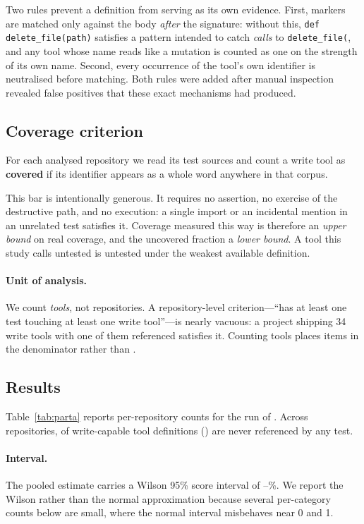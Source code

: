 \documentclass[11pt]{article}
\begin{document}
Two rules prevent a definition from serving as its own evidence. First, markers are
matched only against the body \emph{after} the signature: without this,
\texttt{def delete\_file(path)} satisfies a pattern intended to catch \emph{calls} to
\texttt{delete\_file(}, and any tool whose name reads like a mutation is counted as one
on the strength of its own name. Second, every occurrence of the tool's own identifier
is neutralised before matching. Both rules were added after manual inspection revealed
false positives that these exact mechanisms had produced.

\subsection{Coverage criterion}

For each analysed repository we read its test sources and count a write tool as
\textbf{covered} if its identifier appears as a whole word anywhere in that corpus.

This bar is intentionally generous. It requires no assertion, no exercise of the
destructive path, and no execution: a single import or an incidental mention in an
unrelated test satisfies it. Coverage measured this way is therefore an \emph{upper
bound} on real coverage, and the uncovered fraction a \emph{lower bound}. A tool this
study calls untested is untested under the weakest available definition.

\paragraph{Unit of analysis.} We count \emph{tools}, not repositories. A repository-level
criterion---``has at least one test touching at least one write tool''---is nearly
vacuous: a project shipping 34 write tools with one of them referenced satisfies it.
Counting tools places \AcTools{} items in the denominator rather than \AcRepos{}.

\subsection{Results}

Table~\ref{tab:parta} reports per-repository counts for the run of \AcRunDate{}.
Across \AcRepos{} repositories, \AcUncovered{} of \AcTools{} write-capable tool
definitions (\AcUncoveredPct{}) are never referenced by any test.



\paragraph{Interval.} The pooled estimate carries a Wilson 95\% score interval of
\AcCiLo{}--\AcCiHi{}\%. We report the Wilson rather than the normal approximation
because several per-category counts below are small, where the normal interval
misbehaves near 0 and 1.
\end{document}
